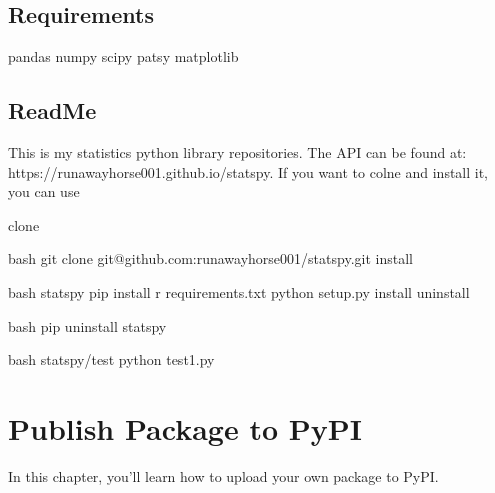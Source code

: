 \documentclass[letterpaper,12pt,english]{sphinxmanual}
\begin{document}
\section{Requirements}
\label{\detokenize{pack:requirements}}
\begin{sphinxVerbatim}[commandchars=\\\{\}]
pandas
numpy
scipy
patsy
matplotlib
\end{sphinxVerbatim}


\section{ReadMe}
\label{\detokenize{pack:readme}}
\begin{sphinxVerbatim}[commandchars=\\\{\}]

This is my statistics python library repositories.
The API can be found at: https://runawayhorse001.github.io/statspy.
If you want to colne and install it, you can use

\PYGZhy{} clone

bash
git clone git@github.com:runawayhorse001/statspy.git
\PYGZhy{} install

bash
 statspy
pip install \PYGZhy{}r requirements.txt
python setup.py install
\PYGZhy{} uninstall

bash
pip uninstall statspy

\PYGZhy{} 

bash
 statspy/test
python test1.py
\end{sphinxVerbatim}


\chapter{Publish Package to PyPI}
\label{\detokenize{pypi:publish-package-to-pypi}}\label{\detokenize{pypi:pypi}}\label{\detokenize{pypi::doc}}
In this chapter, you’ll learn how to upload your own package to PyPI.
\end{document}
